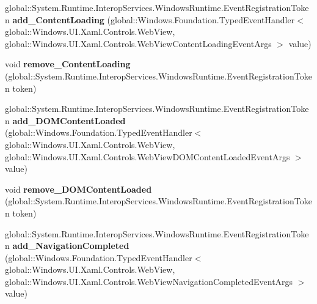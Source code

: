 \begin{DoxyCompactItemize}
\item 
\mbox{\label{interface_windows_1_1_u_i_1_1_xaml_1_1_controls_1_1_i_web_view2_abc203b6881b1b76a4b7672b7fb427bda}} 
global\+::\+System.\+Runtime.\+Interop\+Services.\+Windows\+Runtime.\+Event\+Registration\+Token {\bfseries add\+\_\+\+Content\+Loading} (global\+::\+Windows.\+Foundation.\+Typed\+Event\+Handler$<$ global\+::\+Windows.\+U\+I.\+Xaml.\+Controls.\+Web\+View, global\+::\+Windows.\+U\+I.\+Xaml.\+Controls.\+Web\+View\+Content\+Loading\+Event\+Args $>$ value)
\item 
\mbox{\label{interface_windows_1_1_u_i_1_1_xaml_1_1_controls_1_1_i_web_view2_ae842c5ef69d1e7a4cea4c4e546878fc0}} 
void {\bfseries remove\+\_\+\+Content\+Loading} (global\+::\+System.\+Runtime.\+Interop\+Services.\+Windows\+Runtime.\+Event\+Registration\+Token token)
\item 
\mbox{\label{interface_windows_1_1_u_i_1_1_xaml_1_1_controls_1_1_i_web_view2_ad7b79a31e2034f7e2d82141d4fb98882}} 
global\+::\+System.\+Runtime.\+Interop\+Services.\+Windows\+Runtime.\+Event\+Registration\+Token {\bfseries add\+\_\+\+D\+O\+M\+Content\+Loaded} (global\+::\+Windows.\+Foundation.\+Typed\+Event\+Handler$<$ global\+::\+Windows.\+U\+I.\+Xaml.\+Controls.\+Web\+View, global\+::\+Windows.\+U\+I.\+Xaml.\+Controls.\+Web\+View\+D\+O\+M\+Content\+Loaded\+Event\+Args $>$ value)
\item 
\mbox{\label{interface_windows_1_1_u_i_1_1_xaml_1_1_controls_1_1_i_web_view2_a4826b2efe9b800c1e85e3a78e742e78c}} 
void {\bfseries remove\+\_\+\+D\+O\+M\+Content\+Loaded} (global\+::\+System.\+Runtime.\+Interop\+Services.\+Windows\+Runtime.\+Event\+Registration\+Token token)
\item 
\mbox{\label{interface_windows_1_1_u_i_1_1_xaml_1_1_controls_1_1_i_web_view2_ac4ba94ee4e34e6437000d0e1f34a76cf}} 
global\+::\+System.\+Runtime.\+Interop\+Services.\+Windows\+Runtime.\+Event\+Registration\+Token {\bfseries add\+\_\+\+Navigation\+Completed} (global\+::\+Windows.\+Foundation.\+Typed\+Event\+Handler$<$ global\+::\+Windows.\+U\+I.\+Xaml.\+Controls.\+Web\+View, global\+::\+Windows.\+U\+I.\+Xaml.\+Controls.\+Web\+View\+Navigation\+Completed\+Event\+Args $>$ value)

\end{DoxyCompactItemize}
